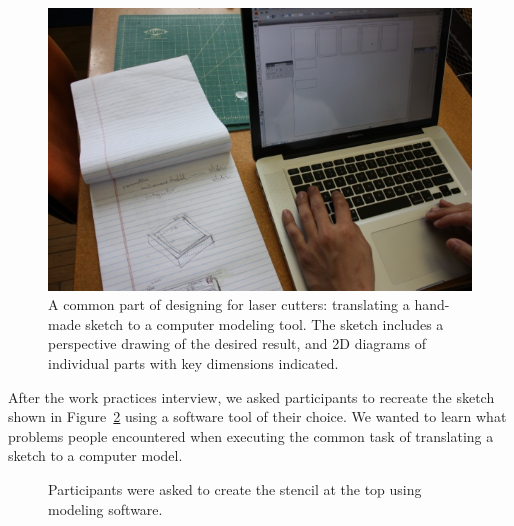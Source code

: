 \documentclass{article}
\begin{document}
\begin{figure}[h]
  \centering
  \includegraphics[width=0.9\linewidth]{img/translate-sketch-to-computer.jpg}
  \caption{A common part of designing for laser cutters: translating a
    hand-made sketch to a computer modeling tool. The sketch includes
    a perspective drawing of the desired result, and 2D diagrams of
    individual parts with key dimensions indicated.}
  \label{fig:translate}
\end{figure}

After the work practices interview, we asked participants to recreate
the sketch shown in Figure~\ref{fig:interview-sketch} using a software
tool of their choice. We wanted to learn what problems people
encountered when executing the common task of translating a sketch to
a computer model.

\begin{figure}[h]
\centering 
{}

\caption{Participants were asked to create the stencil at the top
  using modeling software.}
\label{fig:interview-sketch}
\end{figure}
\end{document}
